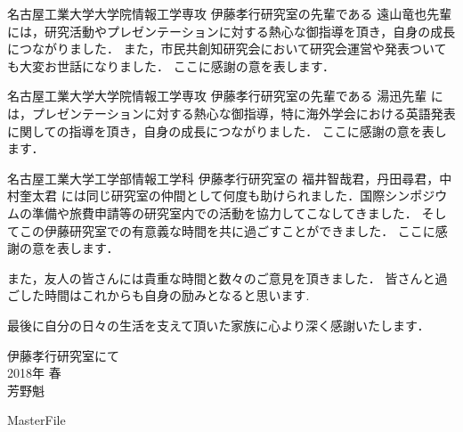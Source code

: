 名古屋工業大学大学院情報工学専攻 伊藤孝行研究室の先輩である 遠山竜也先輩 には，研究活動やプレゼンテーションに対する熱心な御指導を頂き，自身の成長につながりました．
また，市民共創知研究会において研究会運営や発表ついても大変お世話になりました．
ここに感謝の意を表します． \par
\vspace{0.5cm}

名古屋工業大学大学院情報工学専攻 伊藤孝行研究室の先輩である 湯迅先輩 には，プレゼンテーションに対する熱心な御指導，特に海外学会における英語発表に関しての指導を頂き，自身の成長につながりました．
ここに感謝の意を表します． \par
\vspace{0.5cm}

名古屋工業大学工学部情報工学科 伊藤孝行研究室の 福井智哉君，丹田尋君，中村奎太君 には同じ研究室の仲間として何度も助けられました．国際シンポジウムの準備や旅費申請等の研究室内での活動を協力してこなしてきました．
そしてこの伊藤研究室での有意義な時間を共に過ごすことができました．
ここに感謝の意を表します． \par
\vspace{0.5cm}

また，友人の皆さんには貴重な時間と数々のご意見を頂きました．
皆さんと過ごした時間はこれからも自身の励みとなると思います.\par
\vspace{0.5cm}

最後に自分の日々の生活を支えて頂いた家族に心より深く感謝いたします．

\begin{flushright}
伊藤孝行研究室にて\\
2018年 春\\
芳野魁
\end{flushright}
\expandafter\ifx\csname MasterFile\endcsname\relax

\fi
